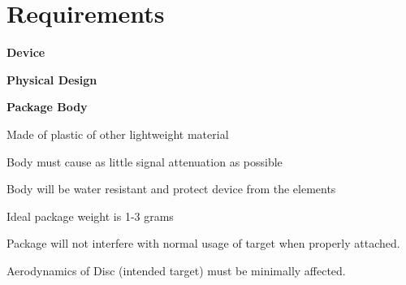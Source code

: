 \documentclass[12pt]{article}
\begin{document}
		\section{Requirements}
	
		  \vspace{16 pt}
		  
		  \begin{packed_enum}
		  	\item \textbf{Device}
		  	\begin{packed_enum}
		  		\item \textbf{Physical Design}
		  		\begin{packed_enum}
		  			\item \textbf{Package Body}
		  			\begin{packed_enum}
						\item Made of plastic of other lightweight material
						\item Body must cause as little signal attenuation as possible
						\item Body will be water resistant and protect device from the elements
						\item Ideal package weight is 1-3 grams
						\item Package will not interfere with normal usage of target when properly attached.
						\begin{packed_enum}
							\item Aerodynamics of Disc (intended target) must be minimally affected. 
							\end{packed_enum}
		  				\end{packed_enum}
		  				

\end{packed_enum}
\end{packed_enum}
\end{packed_enum}
\end{document}
